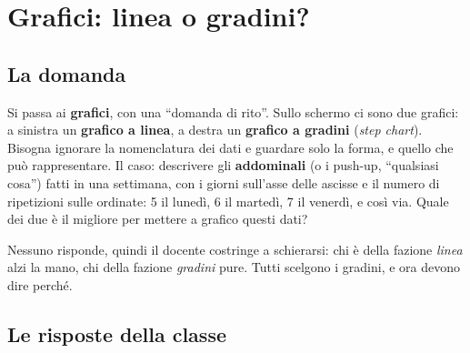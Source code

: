 \section{Grafici: linea o gradini?}
\label{sec:grafici-esercizio}

\subsection{La domanda}

Si passa ai \textbf{grafici}, con una ``domanda di rito''. Sullo schermo ci
sono due grafici: a sinistra un \textbf{grafico a linea}, a destra un
\textbf{grafico a gradini} (\emph{step chart}). Bisogna ignorare la
nomenclatura dei dati e guardare solo la forma, e quello che può
rappresentare. Il caso: descrivere gli \textbf{addominali} (o i push-up,
``qualsiasi cosa'') fatti in una settimana, con i giorni sull'asse delle
ascisse e il numero di ripetizioni sulle ordinate: 5 il lunedì, 6 il
martedì, 7 il venerdì, e così via. Quale dei due è il migliore per mettere a
grafico questi dati?

Nessuno risponde, quindi il docente costringe a schierarsi: chi è della
fazione \emph{linea} alzi la mano, chi della fazione \emph{gradini} pure.
Tutti scelgono i gradini, e ora devono dire perché.

\subsection{Le risposte della classe}

